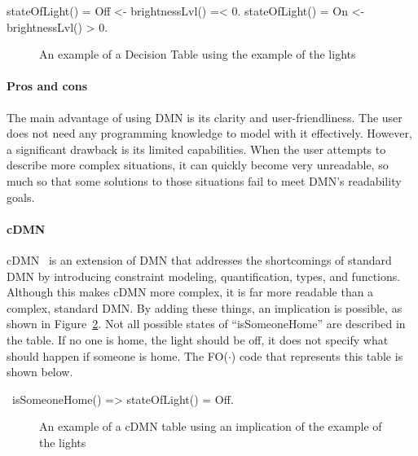 \documentclass[11pt,a4paper]{report}
\newcommand{\fodot}{FO($\cdot$)\xspace}
\begin{document}
\begin{idplisting}
{
   stateOfLight() = Off <- brightnessLvl() =< 0.
   stateOfLight() = On <- brightnessLvl() > 0.
}
\end{idplisting}

\begin{figure}
    \centering
    \caption{An example of a Decision Table using the example of the lights}
    \label{fig:DT}
\end{figure}

\paragraph{ Pros and cons}
The main advantage of using DMN is its clarity and user-friendliness. The user does not need any programming knowledge to model with it effectively. However, a significant drawback is its limited capabilities. When the user attempts to describe more complex situations, it can quickly become very unreadable, so much so that some solutions to those situations fail to meet DMN's readability goals.
 
\paragraph{cDMN}
cDMN~\cite{cDMN} is an extension of DMN that addresses the shortcomings of standard DMN by introducing constraint modeling, quantification, types, and functions. Although this makes cDMN more complex, it is far more readable than a complex, standard DMN. By adding these things, an implication is possible, as shown in Figure~\ref{fig:cDMNTable}. Not all possible states of ``isSomeoneHome'' are described in the table. If no one is home, the light should be off, it does not specify what should happen if someone is home. The \fodot code that represents this table is shown below.
 
\begin{idplisting}
~isSomeoneHome() => stateOfLight() = Off.
\end{idplisting}

\begin{figure}
    \centering
    \caption{An example of a cDMN table using an implication of the example of the lights}
    \label{fig:cDMNTable}
\end{figure}
 
\end{document}
